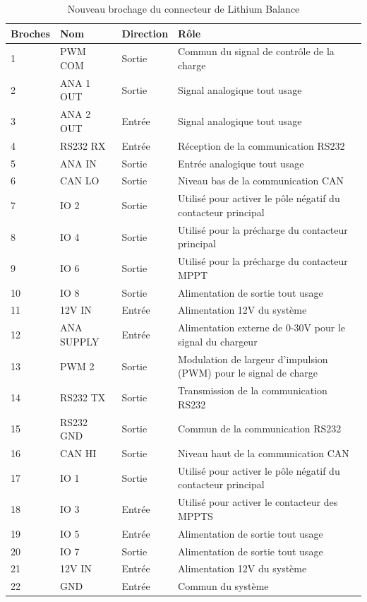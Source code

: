 		\begin{table}[H]
			\centering
			\caption{Nouveau brochage du connecteur de Lithium Balance}
			\label{22CBmsEclipse}	
			
			\begin{tabular}{ | l | l | l | l | }
				\hline
				Broches & Nom & Direction & Rôle \\ \hline
				1 & PWM COM & Sortie & Commun du signal de contrôle de la charge \\ \hline
				2 & ANA 1 OUT & Sortie & Signal analogique tout usage \\ \hline
				3 & ANA 2 OUT & Entrée & Signal analogique tout usage \\ \hline
				4 & RS232 RX & Entrée & Réception de la communication RS232 \\ \hline
				5 & ANA IN & Sortie & Entrée analogique tout usage \\ \hline
				6 & CAN LO & Sortie & Niveau bas de la communication CAN \\ \hline
				7 & IO 2 & Sortie & Utilisé pour activer le pôle négatif du contacteur principal \\ \hline
				8 & IO 4 & Sortie & Utilisé pour la précharge du contacteur principal \\ \hline
				9 & IO 6 & Sortie & Utilisé pour la précharge du contacteur MPPT \\ \hline
				10 & IO 8 & Sortie & Alimentation de sortie tout usage \\ \hline
				11 & 12V IN & Entrée & Alimentation 12V du système \\ \hline
				12 & ANA SUPPLY & Entrée & Alimentation externe de 0-30V pour le signal du chargeur \\ \hline
				13 & PWM 2 & Sortie & Modulation de largeur d'impulsion (PWM) pour le signal de charge \\ \hline
				14 & RS232 TX & Sortie & Transmission de la communication RS232 \\ \hline
				15 & RS232 GND & Sortie & Commun de la communication RS232 \\ \hline
				16 & CAN HI & Sortie & Niveau haut de la communication CAN \\ \hline
				17 & IO 1  & Sortie & Utilisé pour activer le pôle négatif du contacteur principal \\ \hline
				18 & IO 3 & Entrée & Utilisé pour activer le contacteur des MPPTS \\ \hline
				19 & IO 5 & Entrée & Alimentation de sortie tout usage \\ \hline
				20 & IO 7 & Sortie & Alimentation de sortie tout usage \\ \hline
				21 & 12V IN & Entrée & Alimentation 12V du système \\ \hline
				22 & GND & Entrée & Commun du système \\ \hline
			\end{tabular}	
		\end{table}
